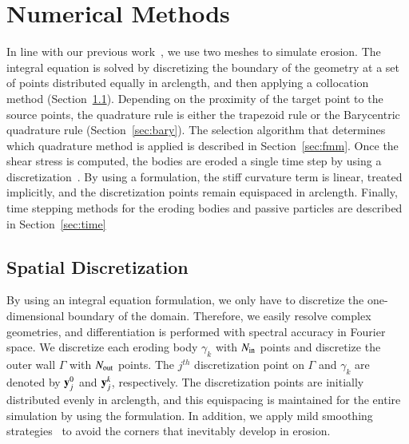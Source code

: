 \documentclass[preprint,10pt]{elsarticle}
\begin{document}
\section{Numerical Methods}
\label{sec:method}
In line with our previous work~\cite{qua-moo2018}, we use two meshes to
simulate erosion. The integral equation is solved by discretizing the
boundary of the geometry at a set of points distributed equally in
arclength, and then applying a collocation method
(Section~\ref{sec:spatialDiscretization}).  Depending on the proximity
of the target point to the source points, the quadrature rule is either
the trapezoid rule or the Barycentric quadrature rule
(Section~\ref{sec:bary}).  The selection algorithm that determines which
quadrature method is applied is described in Section~\ref{sec:fmm}.
Once the shear stress is computed, the bodies are eroded a single time
step by using a {\thL} discretization~\cite{hou-low-she1994}.  By using
a {\thL} formulation, the stiff curvature term is linear, treated
implicitly, and the discretization points remain equispaced in
arclength.  Finally, time stepping methods for the eroding bodies and
passive particles are described in Section~\ref{sec:time}

\subsection{Spatial Discretization}
\label{sec:spatialDiscretization}
By using an integral equation formulation, we only have to discretize
the one-dimensional boundary of the domain.  Therefore, we easily
resolve complex geometries, and differentiation is performed with
spectral accuracy in Fourier space.  We discretize each eroding body
$\gamma_k$ with $N_{\mathrm{in}}$ points and discretize the outer wall $\Gamma$
with $N_{\mathrm{out}}$ points.  The $j^{th}$ discretization point on $\Gamma$ and
$\gamma_k$ are denoted by ${\mathbf{y}}_j^0$ and ${\mathbf{y}}^k_j$, respectively.  The
discretization points are initially distributed evenly in arclength, and
this equispacing is maintained for the entire simulation by using the
{\thL} formulation.  In addition, we apply mild smoothing
strategies~\cite{qua-moo2018} to avoid the corners that inevitably
develop in erosion.
\end{document}
